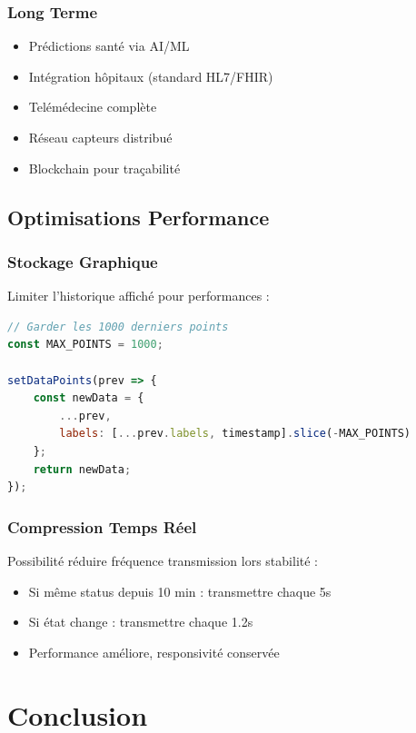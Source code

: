 \documentclass[12pt,french]{report}
\begin{document}
\subsection{Long Terme}

\begin{itemize}
    \item Prédictions santé via AI/ML
    \item Intégration hôpitaux (standard HL7/FHIR)
    \item Telémédecine complète
    \item Réseau capteurs distribué
    \item Blockchain pour traçabilité
\end{itemize}

\section{Optimisations Performance}

\subsection{Stockage Graphique}

Limiter l'historique affiché pour performances :

\begin{lstlisting}[language=JavaScript]
// Garder les 1000 derniers points
const MAX_POINTS = 1000;

setDataPoints(prev => {
    const newData = { 
        ...prev,
        labels: [...prev.labels, timestamp].slice(-MAX_POINTS)
    };
    return newData;
});
\end{lstlisting}

\subsection{Compression Temps Réel}

Possibilité réduire fréquence transmission lors stabilité :

\begin{itemize}
    \item Si même status depuis 10 min : transmettre chaque 5s
    \item Si état change : transmettre chaque 1.2s
    \item Performance améliore, responsivité conservée
\end{itemize}

\chapter{Conclusion}
\end{document}
